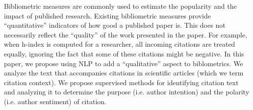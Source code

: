 Bibliometric measures are commonly used to estimate the popularity and the impact of published research. Existing bibliometric measures
 provide ``quantitative'' indicators of how good a published paper is.
 This does not necessarily reflect the ``quality'' of the work
 presented in the paper. For example, when h-index is computed
 for a researcher, all incoming citations are treated equally, ignoring
 the fact that some of these citations might be negative. In this
 paper, we propose using NLP to add a ``qualitative'' aspect to
 biblometrics. We analyze the text that accompanies citations in
 scientific articles (which we term citation context). We
 propose supervised methods for identifying citation text and analyzing
 it to determine the purpose (i.e. author intention) and the polarity
 (i.e. author sentiment) of citation.

